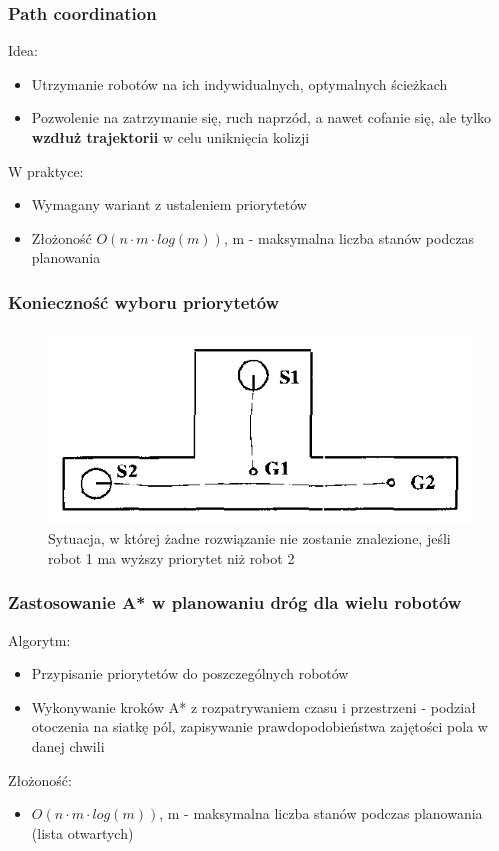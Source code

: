 \subsubsection{Path coordination}
Idea:
\begin{itemize}
	\item Utrzymanie robotów na ich indywidualnych, optymalnych ścieżkach
	\item Pozwolenie na zatrzymanie się, ruch naprzód, a nawet cofanie się, ale tylko {\bf wzdłuż trajektorii} w celu uniknięcia kolizji
\end{itemize}
W praktyce:
\begin{itemize}
	\item Wymagany wariant z ustaleniem priorytetów
	\item Złożoność $O(n \cdot m \cdot log(m))$, m - maksymalna liczba stanów podczas planowania %
\end{itemize}

\subsubsection{Konieczność wyboru priorytetów}
\begin{figure}[htp]
	\centering
	\includegraphics[width=\textwidth,keepaspectratio]{img/article1/fig1}
	\caption{Sytuacja, w której żadne rozwiązanie nie zostanie znalezione, jeśli robot 1 ma wyższy priorytet niż robot 2}
\end{figure}

\subsubsection{Zastosowanie A* w planowaniu dróg dla wielu robotów}
Algorytm:
\begin{itemize}
	\item Przypisanie priorytetów do poszczególnych robotów
	\item Wykonywanie kroków A* z rozpatrywaniem czasu i przestrzeni - podział otoczenia na siatkę pól, zapisywanie prawdopodobieństwa zajętości pola w danej chwili
\end{itemize}
Złożoność:
\begin{itemize}
	\item $O(n \cdot m \cdot log(m))$, m - maksymalna liczba stanów podczas planowania (lista otwartych) %
\end{itemize}

